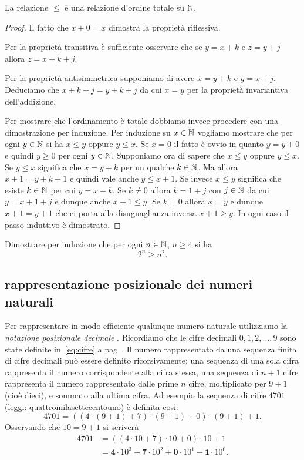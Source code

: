 \begin{theorem}
La relazione $\le$ è una relazione d'ordine totale su ${\mathbb N}$.
\end{theorem}
%
\begin{proof}
  Il fatto che $x+0=x$ dimostra la proprietà riflessiva.
  
  Per la proprietà transitiva è sufficiente osservare
  che se $y=x+k$ e $z=y+j$ allora $z=x+k+j$.

  Per la proprietà antisimmetrica supponiamo di avere $x=y+k$ 
  e $y=x+j$. Deduciamo che $x+k+j = y +k+j$ da cui $x=y$
  per la proprietà invariantiva dell'addizione.
  
  Per mostrare che l'ordinamento è totale dobbiamo invece 
  procedere con una dimostrazione per induzione. 
  Per induzione su $x\in {\mathbb N}$ vogliamo mostrare 
  che per ogni $y\in {\mathbb N}$ si ha $x\le y$ oppure $y\le x$. 
  Se $x=0$ il fatto è ovvio in quanto $y=y+0$ e quindi $y\ge 0$
  per ogni $y\in {\mathbb N}$.
  Supponiamo ora di sapere che $x\le y$ oppure $y\le x$.
  Se $y\le x$ significa che $x = y + k$ per un qualche 
  $k\in {\mathbb N}$. Ma allora $x+1 = y + k + 1$ e quindi 
  vale anche $y\le x+1$. 
  Se invece $x\le y$ significa che esiste $k\in {\mathbb N}$ 
  per cui $y=x+k$. Se $k\neq 0$ allora $k=1+j$ con $j\in {\mathbb N}$
  da cui $y=x+1+j$ e dunque anche $x+1\le y$.
  Se $k=0$ allora $x=y$ e dunque $x+1=y+1$ che ci porta 
  alla disuguaglianza inversa $x+1\ge y$.
  In ogni caso il passo induttivo è dimostrato.
\end{proof}

\begin{exercise}
  Dimostrare per induzione che per ogni $n\in {\mathbb N}$, $n\ge 4$ si ha 
  \[  
    2^n \ge n^2.
  \]
\end{exercise}

\subsection{rappresentazione posizionale dei numeri naturali}

Per rappresentare in modo efficiente qualunque numero naturale utilizziamo la 
\emph{notazione posizionale decimale}%
%
.
Ricordiamo che le cifre decimali $0,1,2,\dots, 9$ sono state definite in~\eqref{eq:cifre}
a pag~\pageref{eq:cifre}.
Il numero rappresentato da una sequenza finita di cifre decimali può essere 
definito ricorsivamente: una sequenza di una sola cifra rappresenta il numero 
corrispondente alla cifra stessa, una sequenza di $n+1$ cifre rappresenta il 
numero rappresentato dalle prime $n$ cifre, moltiplicato per $9+1$ (cioè dieci),
e sommato alla ultima cifra. 
Ad esempio la sequenza di cifre $4701$ (leggi: quattromilasettecentouno)
è definita così:
\[ 
  4701 = ((4\cdot(9+1)+7)\cdot(9+1)+0)\cdot(9+1)+1.
\]
Osservando che $10 = 9+1$ si scriverà
\begin{align*}
  4701 
  & = ((4\cdot 10 + 7)\cdot 10 +0)\cdot 10 + 1 \\
  & = \mathbf 4\cdot 10^3 + \mathbf 7\cdot 10^2 + \mathbf 0\cdot 10^1 + \mathbf 1 \cdot 10^0. 
\end{align*}


